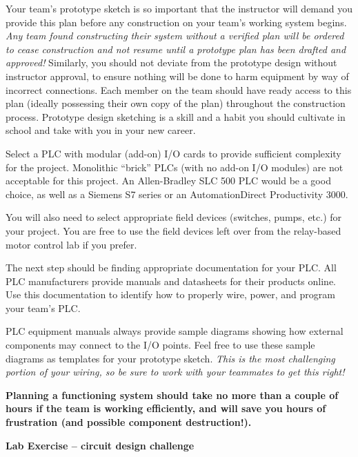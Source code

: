 Your team's prototype sketch is so important that the instructor will demand you provide this plan before any construction on your team's working system begins.  {\it Any team found constructing their system without a verified plan will be ordered to cease construction and not resume until a prototype plan has been drafted and approved!}  Similarly, you should not deviate from the prototype design without instructor approval, to ensure nothing will be done to harm equipment by way of incorrect connections.  Each member on the team should have ready access to this plan (ideally possessing their own copy of the plan) throughout the construction process.  Prototype design sketching is a skill and a habit you should cultivate in school and take with you in your new career.

\vskip 10pt

Select a PLC with modular (add-on) I/O cards to provide sufficient complexity for the project.  Monolithic ``brick'' PLCs (with no add-on I/O modules) are not acceptable for this project.  An Allen-Bradley SLC 500 PLC would be a good choice, as well as a Siemens S7 series or an AutomationDirect Productivity 3000.

You will also need to select appropriate field devices (switches, pumps, etc.) for your project.  You are free to use the field devices left over from the relay-based motor control lab if you prefer.

The next step should be finding appropriate documentation for your PLC.  All PLC manufacturers provide manuals and datasheets for their products online.  Use this documentation to identify how to properly wire, power, and program your team's PLC.  

PLC equipment manuals always provide sample diagrams showing how external components may connect to the I/O points.  Feel free to use these sample diagrams as templates for your prototype sketch.  {\it This is the most challenging portion of your wiring, so be sure to work with your teammates to get this right!}

\vskip 10pt

{\bf Planning a functioning system should take no more than a couple of hours if the team is working efficiently, and will save you hours of frustration (and possible component destruction!).}







\vfil \eject

\noindent
{\bf Lab Exercise -- circuit design challenge}

